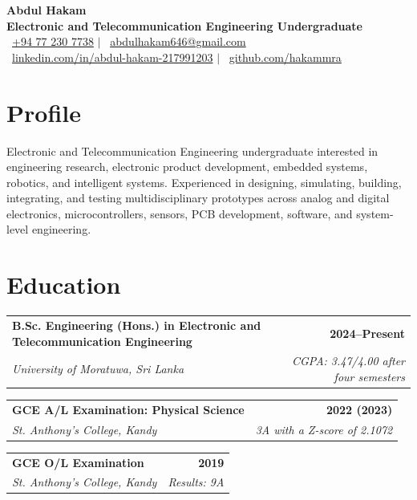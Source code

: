 \documentclass[a4paper,10pt]{article}
\makeatletter
\newcommand{\educationEntry}[4]{%
  \begin{tabularx}{\textwidth}{@{}Xr@{}}
    \textbf{#1} & \textbf{\small #2} \\
    \textit{#3} & \textit{\small #4}
  \end{tabularx}
}
\makeatother
\begin{document}
\fontsize{9.5}{11.25}\selectfont

\begin{center}
  {\LARGE\bfseries Abdul Hakam}\\[0.75mm]
  {\large\bfseries Electronic and Telecommunication Engineering Undergraduate}\\[1.5mm]

  \small
  \faPhone\ \href{tel:+94772307738}{+94 77 230 7738}
  \quad $\vert$ \quad
  \faEnvelope\ \href{mailto:abdulhakam646@gmail.com}{abdulhakam646@gmail.com}\\[0.8mm]

  \faLinkedin\ 
  \href{https://www.linkedin.com/in/abdul-hakam-217991203}
  {linkedin.com/in/abdul-hakam-217991203}
  \quad $\vert$ \quad
  \faGithub\ 
  \href{https://github.com/hakammra}
  {github.com/hakammra}
\end{center}

\vspace{-1.2mm}

\section{Profile}
Electronic and Telecommunication Engineering undergraduate interested in engineering research, electronic product development, embedded systems, robotics, and intelligent systems. Experienced in designing, simulating, building, integrating, and testing multidisciplinary prototypes across analog and digital electronics, microcontrollers, sensors, PCB development, software, and system-level engineering.
\section{Education}
\educationEntry
  {B.Sc. Engineering (Hons.) in Electronic and Telecommunication Engineering}
  {2024--Present}
  {University of Moratuwa, Sri Lanka}
  {CGPA: 3.47/4.00 after four semesters}

\vspace{1.35mm}
\educationEntry
  {GCE A/L Examination: Physical Science}
  {2022 (2023)}
  {St. Anthony's College, Kandy}
  {3A with a Z-score of 2.1072}

\vspace{1.35mm}
\educationEntry
  {GCE O/L Examination}
  {2019}
  {St. Anthony's College, Kandy}
  {Results: 9A}
\end{document}
